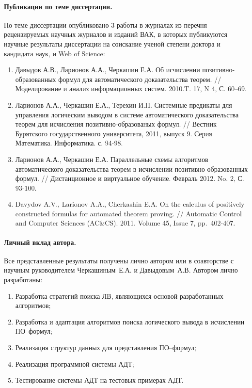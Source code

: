 \paragraph{Публикации по теме диссертации.} По теме диссертации опубликовано 3 работы в журналах из перечня рецензируемых научных журналов и изданий ВАК, в которых публикуются научные результаты диссертации на соискание ученой степени доктора и кандидата наук, и Web of Science:
\begin{enumerate}
\item Давыдов А.В., Ларионов А.А., Черкашин Е.А. Об исчислении
позитивно-образованных формул для автоматического доказательства
теорем. // Моделирование и анализ информационных систем. 2010.T. 17, N
4, С. 60--69.
\item Ларионов А.А., Черкашин Е.А., Терехин И.Н. Системные предикаты для
управления логическим выводом в системе автоматического доказательства
теорем для исчисления позитивно-образованых формул. // Вестник
Бурятского государственного университета, 2011, выпуск 9. Серия
Математика. Информатика. с. 94-98.
\item Ларионов А.А., Черкашин Е.А. Параллельные схемы алгоритмов
автоматического доказательства теорем в исчислении
позитивно-образованных формул. // Дистанционное и виртуальное
обучение. Февраль 2012. No. 2, С. 93-100.
\item Davydov A.V., Larionov A.A., Cherkashin E.A. On the calculus of
positively constructed formulas for automated theorem proving. //
Automatic Control and Computer Sciences (AC\&CS). 2011. Volume 45, Issue 7, pp.~402-407.
\end{enumerate}

\paragraph{Личный вклад автора.} Все представленные результаты получены лично автором или в соавторстве с научным руководителем Черкашиным~Е.А. и Давыдовым~А.В. Автором лично разработаны:
\begin{enumerate}
\item Разработка стратегий поиска ЛВ, являющихся основой разработанных алгоритмов;
\item Разработка и адаптация алгоритмов поиска логического вывода в исчислении ПО--формул;
\item Реализация структур данных для представления ПО--формул;
\item Реализация программной системы АДТ;
\item Тестирование системы АДТ на тестовых примерах АДТ.
\end{enumerate}

